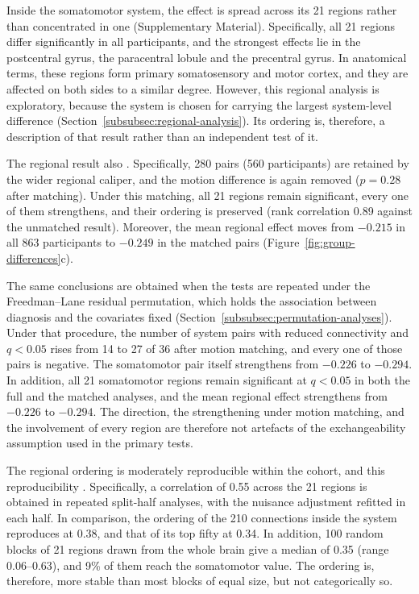 Inside the somatomotor system, the effect is spread across its 21 regions rather than
concentrated in one (Supplementary Material). Specifically, all 21 regions differ
significantly in all participants, and the strongest effects lie in the postcentral gyrus,
the paracentral lobule and the precentral gyrus. In anatomical terms, these regions form
primary somatosensory and motor cortex, and they are affected on both sides to a similar
degree. However, this regional analysis is exploratory, because the system is chosen for
carrying the largest system-level difference (Section~\ref{subsubsec:regional-analysis}). Its ordering is,
therefore, a description of that result rather than an independent test of it.

The regional result also .
Specifically, 280 pairs (560 participants) are retained by the wider regional caliper, and
the motion difference is again removed ($p=0.28$ after matching). Under this matching, all 21
regions remain significant, every one of them strengthens, and their ordering is preserved
(rank correlation 0.89 against the unmatched result). Moreover, the mean regional effect moves from $-0.215$ in all 863
participants to $-0.249$ in the matched pairs
(Figure~\ref{fig:group-differences}c).

The same conclusions are obtained when the tests are repeated under the Freedman--Lane
residual permutation, which holds the association between diagnosis and the covariates fixed
(Section~\ref{subsubsec:permutation-analyses}). Under that procedure, the number of system
pairs with reduced connectivity and $q<0.05$ rises from 14 to 27 of 36 after motion matching,
and every one of those pairs is negative. The somatomotor pair itself strengthens from
$-0.226$ to $-0.294$. In addition, all 21 somatomotor regions remain significant at $q<0.05$
in both the full and the matched analyses, and the mean regional effect strengthens from
$-0.226$ to $-0.294$. The direction, the strengthening under motion matching, and the
involvement of every region are therefore not artefacts of the exchangeability assumption
used in the primary tests.

The regional ordering is moderately reproducible within the cohort, and this reproducibility
. Specifically, a correlation of
0.55 across the 21 regions is obtained in repeated split-half analyses, with the nuisance
adjustment refitted in each half. In comparison, the ordering of the 210 connections inside the
system reproduces at 0.38, and that of its top fifty at 0.34. In addition, 100 random
blocks of 21 regions drawn from the whole brain give a median of 0.35 (range 0.06--0.63),
and 9\% of them reach the somatomotor value. The ordering is, therefore, more stable than
most blocks of equal size, but not categorically so.

